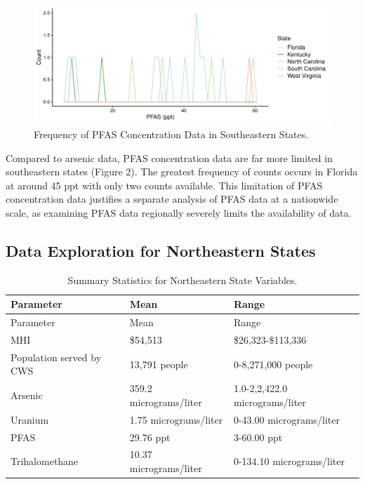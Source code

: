 \documentclass[12pt,]{article}
\begin{document}
\begin{figure}
\centering
\includegraphics{Project_Template_files/figure-latex/figs2-1.pdf}
\caption{Frequency of PFAS Concentration Data in Southeastern States.}
\end{figure}

Compared to arsenic data, PFAS concentration data are far more limited
in southeastern states (Figure 2). The greatest frequency of counts
occurs in Florida at around 45 ppt with only two counts available. This
limitation of PFAS concentration data justifies a separate analysis of
PFAS data at a nationwide scale, as examining PFAS data regionally
severely limits the availability of data.

\newpage

\hypertarget{data-exploration-for-northeastern-states}{%
\subsection{Data Exploration for Northeastern
States}\label{data-exploration-for-northeastern-states}}

\begin{longtable}[]{@{}lll@{}}
\caption{Summary Statistics for Northeastern State
Variables.}\tabularnewline
\toprule
Parameter & Mean & Range\tabularnewline
\midrule
\endfirsthead
\toprule
Parameter & Mean & Range\tabularnewline
\midrule
\endhead
MHI & \$54,513 & \$26,323-\$113,336\tabularnewline
Population served by CWS & 13,791 people & 0-8,271,000
people\tabularnewline
Arsenic & 359.2 micrograms/liter & 1.0-2,2,422.0
micrograms/liter\tabularnewline
Uranium & 1.75 micrograms/liter & 0-43.00
micrograms/liter\tabularnewline
PFAS & 29.76 ppt & 3-60.00 ppt\tabularnewline
Trihalomethane & 10.37 micrograms/liter & 0-134.10
micrograms/liter\tabularnewline
\bottomrule
\end{longtable}

\begin{quote}
\end{quote}
\end{document}
